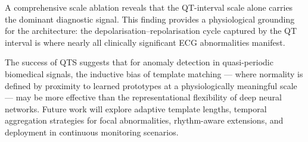 \documentclass{iopjournal}
\begin{document}
A comprehensive scale ablation reveals that the QT-interval scale alone carries the dominant diagnostic signal. This finding provides a physiological grounding for the architecture: the depolarisation--repolarisation cycle captured by the QT interval is where nearly all clinically significant ECG abnormalities manifest.

The success of QTS suggests that for anomaly detection in quasi-periodic biomedical signals, the inductive bias of template matching --- where normality is defined by proximity to learned prototypes at a physiologically meaningful scale --- may be more effective than the representational flexibility of deep neural networks. Future work will explore adaptive template lengths, temporal aggregation strategies for focal abnormalities, rhythm-aware extensions, and deployment in continuous monitoring scenarios. 

\end{document}
